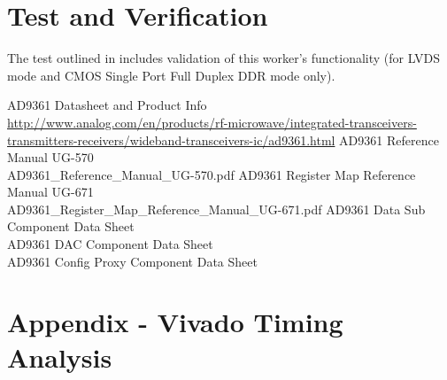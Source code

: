 \documentclass{article}
\begin{document}
\section*{Test and Verification}
The test outlined in \cite{dac_comp_datasheet} includes validation of this worker's functionality (for LVDS mode and CMOS Single Port Full Duplex DDR mode only).
\pagebreak
\begin{thebibliography}{1}

 AD9361 Datasheet and Product Info \\
\url{http://www.analog.com/en/products/rf-microwave/integrated-transceivers-transmitters-receivers/wideband-transceivers-ic/ad9361.html}
 AD9361 Reference Manual UG-570\\
AD9361\_Reference\_Manual\_UG-570.pdf
 AD9361 Register Map Reference Manual UG-671\\
AD9361\_Register\_Map\_Reference\_Manual\_UG-671.pdf
  AD9361 Data Sub Component Data Sheet \\
  AD9361 DAC Component Data Sheet \\
  AD9361 Config Proxy Component Data Sheet \\

\end{thebibliography}
\pagebreak

\section{Appendix - Vivado Timing Analysis} \label{appendix}
\end{document}
